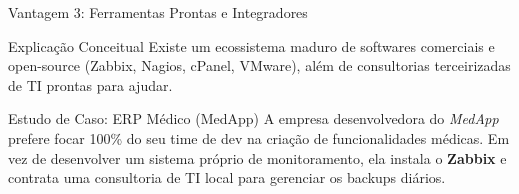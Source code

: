 \documentclass[9pt]{beamer}
\begin{document}
\begin{frame}[fragile]{Vantagem 3: Ferramentas Prontas e Integradores}
\begin{block}{Explicação Conceitual}
Existe um ecossistema maduro de softwares comerciais e open-source (Zabbix, Nagios, cPanel, VMware), além de consultorias terceirizadas de TI prontas para ajudar.
\end{block}

\vspace{0.2cm}
\begin{exampleblock}{Estudo de Caso: ERP Médico (MedApp)}
A empresa desenvolvedora do \textit{MedApp} prefere focar 100\% do seu time de dev na criação de funcionalidades médicas. Em vez de desenvolver um sistema próprio de monitoramento, ela instala o \textbf{Zabbix} e contrata uma consultoria de TI local para gerenciar os backups diários.
\end{exampleblock}

\vspace{0.2cm}
\begin{center}
\end{center}
\end{frame}
\end{document}
